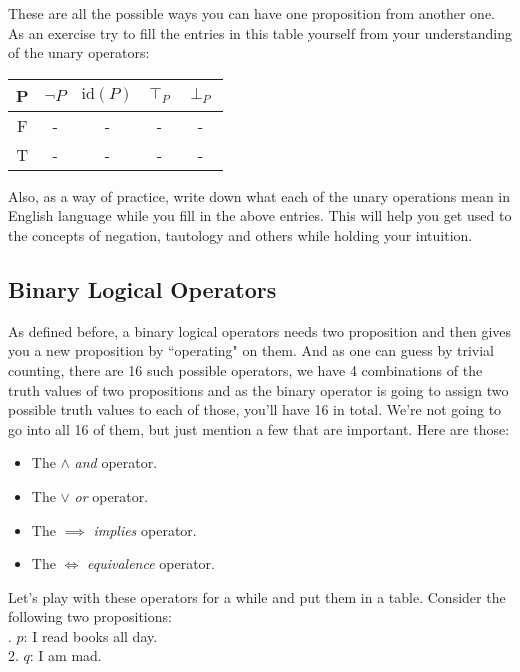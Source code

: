 \documentclass{article}
\begin{document}
These are all the possible ways you can have one proposition from another one.
As an exercise try to fill the entries in this table yourself from your understanding of the unary operators:

\begin{center}
\begin{tabular}{c||c|c|c|c}
	P & $\neg P$ & $\mathrm{id}(P)$ & $\top_{P}$ & $\perp_{P}$ \\
	\hline
	F & - & - & - & - \\
	T & - & - & - & -

\end{tabular}
\end{center}

Also, as a way of practice, write down what each of the unary operations mean in English language while you fill in the above entries. This will help you get used to the concepts of negation, tautology and others while holding your intuition. 

\subsection{Binary Logical Operators}

As defined before, a binary logical operators needs two proposition and then gives you a new proposition by ``operating" on them. And as one can guess by trivial counting, there are 16 such possible operators, we have 4 combinations of the truth values of two propositions and as the binary operator is going to assign two possible truth values to each of those, you'll have 16 in total. We're not going to go into all 16 of them, but just mention a few that are important. Here are those:

\begin{itemize}
	\item The $\land$ \textit{and} operator.
	\item The $\lor$ \textit{or} operator.
	\item The $\implies$ \textit{implies} operator.
	\item The $\iff$ \textit{equivalence} operator.
\end{itemize}

Let's play with these operators for a while and put them in a table. Consider the following two propositions: \\

. $p$: I read books all day. \\
2. $q$: I am mad. \\
\end{document}
